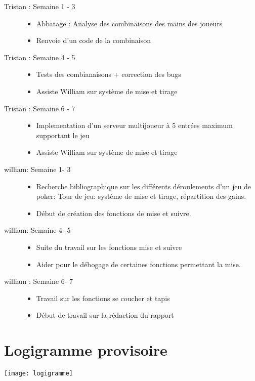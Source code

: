 \documentclass[12pt,a4paper]{article}
\begin{document}
\begin{description}
\item[Tristan : Semaine 1 - 3]
{
\begin{itemize}
    \item Abbatage : Analyse des combinaisons des mains des joueurs
    \item Renvoie d'un code de la combinaison
\end{itemize}
}
\item[Tristan : Semaine 4 - 5]
{
\begin{itemize}
    \item Tests des combianaisons + correction des bugs
    \item Assiste William sur système de mise et tirage
\end{itemize}
}
\item[Tristan : Semaine 6 - 7]
{
\begin{itemize}
    \item Implementation d'un serveur multijoueur à 5 entrées maximum supportant le jeu
    \item Assiste William sur système de mise et tirage
\end{itemize}
}

\item[william: Semaine 1- 3]
{
\begin{itemize}
    \item Recherche bibliographique sur les différents déroulements d'un jeu de poker: Tour de jeu: système de mise et tirage, répartition des gains.
    \item Début de création des fonctions de mise et suivre.
\end{itemize}
}
\item[william: Semaine 4- 5]
{
\begin{itemize}
    \item Suite du travail sur les fonctions mise et suivre
    \item Aider pour le débogage de certaines fonctions permettant la mise.
\end{itemize}
}

\item[william : Semaine 6- 7]
{
\begin{itemize}
    \item  Travail sur les fonctions se coucher et tapis
    \item Début de travail sur la rédaction du rapport
\end{itemize}
}

\end{description}

\section{Logigramme provisoire}
\texttt{[image: logigramme]}
\end{document}
